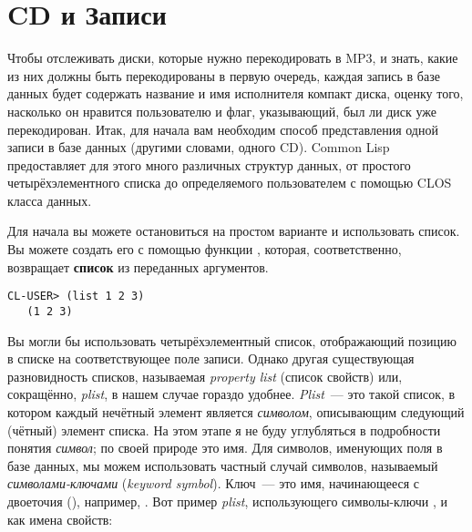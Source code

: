 \section{CD и Записи}

Чтобы отслеживать диски, которые нужно перекодировать в MP3, и знать, какие из них должны
быть перекодированы в первую очередь, каждая запись в базе данных будет содержать название
и имя исполнителя компакт диска, оценку того, насколько он нравится пользователю и флаг,
указывающий, был ли диск уже перекодирован. Итак, для начала вам необходим способ
представления одной записи в базе данных (другими словами, одного CD). Common Lisp
предоставляет для этого много различных структур данных, от простого четырёхэлементного
списка до определяемого пользователем с помощью CLOS класса данных.

Для начала вы можете остановиться на простом варианте и использовать список. Вы можете
создать его с помощью функции , которая, соответственно, возвращает
\textbf{список}  из
переданных аргументов.

\begin{lstlisting}[style=lisprepl]
  CL-USER> (list 1 2 3)
   (1 2 3)
\end{lstlisting}

Вы могли бы использовать четырёхэлементный список, отображающий позицию в списке на
соответствующее поле записи. Однако другая существующая разновидность списков, называемая
\textit{property list} (список свойств) или, сокращённо, \textit{plist}, в нашем случае
гораздо удобнее. \textit{Plist}~--- это такой список, в котором каждый нечётный элемент
является \textit{символом}, описывающим следующий (чётный) элемент списка. На этом этапе я
не буду углубляться в подробности понятия \textit{символ}; по своей природе это имя. Для
символов, именующих поля в базе данных, мы можем использовать частный случай символов,
называемый \textit{символами-ключами} (\textit{keyword symbol}). Ключ~--- это имя,
начинающееся с двоеточия (\code{:}), например, . Вот пример \textit{plist}, использующего
символы-ключи ,  и  как имена свойств:

